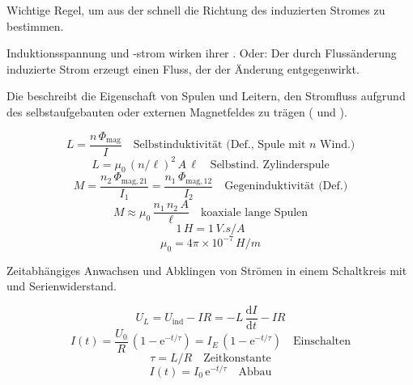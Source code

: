 \begin{runintext}
Wichtige Regel, um aus der  schnell die Richtung des induzierten Stromes zu bestimmen.
\end{runintext}
\begin{defbox}
Induktionsspannung und -strom wirken ihrer . Oder: Der durch Flussänderung induzierte Strom erzeugt einen Fluss, der der Änderung entgegenwirkt.
\end{defbox}

\begin{runintext}
Die  beschreibt die Eigenschaft von Spulen und Leitern, den Stromfluss aufgrund des selbstaufgebauten oder externen Magnetfeldes zu trägen ( und ).
\end{runintext}
\begin{formulabox}
\[ L = \frac{n\,\Phi_{\mathrm{mag}}}{I} \quad \text{Selbstinduktivität (Def., Spule mit $n$ Wind.)} \]
\[ L = \mu_0\,(n/\ell)^2\,A\,\ell \quad \text{Selbstind.\ Zylinderspule} \]
\formulasep
\[ M = \frac{n_2\,\Phi_{\mathrm{mag},21}}{I_1} = \frac{n_1\,\Phi_{\mathrm{mag},12}}{I_2} \quad \text{Gegeninduktivität (Def.)} \]
\formulasep
\[ M \approx \mu_0\,\frac{n_1\,n_2\,A}{\ell} \quad \text{koaxiale lange Spulen} \]
\[ 1\,\si{H} = 1\,\si{V.s/A} \]
\[ \mu_0 = 4\pi\times 10^{-7}\,\si{H/m} \]
\end{formulabox}

\begin{runintext}
Zeitabhängiges Anwachsen und Abklingen von Strömen in einem Schaltkreis mit  und Serienwiderstand.
\end{runintext}
\begin{formulabox}
\[ U_L = U_{\mathrm{ind}} - I R = -L\,\frac{\mathrm{d}I}{\mathrm{d}t} - I R \]
\formulasep
\[ I(t) = \frac{U_0}{R}\,(1 - \mathrm{e}^{-t/\tau}) = I_E\,(1 - \mathrm{e}^{-t/\tau}) \quad \text{Einschalten} \]
\[ \tau = L/R \quad \text{Zeitkonstante} \]
\formulasep
\[ I(t) = I_0\,\mathrm{e}^{-t/\tau} \quad \text{Abbau} \]
\end{formulabox}

